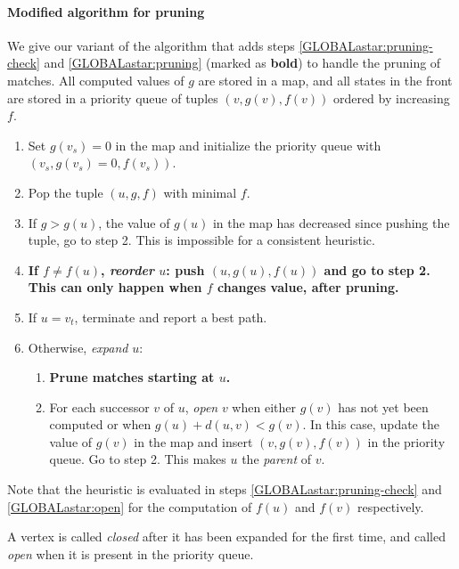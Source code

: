 \paragraph{Modified \A algorithm for pruning} \label{GLOBALsec:astar}


We give our variant of the \A algorithm \citep{hart1968formal} that adds steps
\cref{GLOBALastar:pruning-check} and \cref{GLOBALastar:pruning} (marked as \textbf{bold}) to handle the
pruning of matches. All computed values of $g$ are stored in a map, and all
states in the front are stored in a priority queue of tuples $(v, g(v), f(v))$
ordered by increasing $f$.

\newcommand{\bolditem}{\refstepcounter{enumi}\item[\textbf{\theenumi.}]}
\newcommand{\boldsubitem}{\refstepcounter{enumii}\item[\textbf{\theenumii.}]}
\renewcommand{\algletter}{A}
\begin{enumerate}
  \item Set $g(v_s) = 0$ in the map and initialize the priority queue with
        $(v_s, g(v_s){=}0, f(v_s))$.
  \item Pop the tuple $(u, g, f)$ with minimal $f$.
  \item If $g > g(u)$, \ie the value of $g(u)$ in the map has decreased since pushing the
        tuple, go to step 2. This is impossible for a consistent heuristic.
  \item \label{GLOBALastar:pruning-check} \textbf{If $f \neq f(u)$, \emph{reorder} $u$: push $(u, g(u), f(u))$ and
        go to step 2. This can only happen when $f$ changes value, \ie after
        pruning.}
  \item If $u=v_t$, terminate and report a best path.
  \item Otherwise, \emph{expand} $u$:
  \begin{enumerate}
    \item \label{GLOBALastar:pruning} \textbf{Prune matches starting at $u$.}
    \item \label{GLOBALastar:open}
        For each successor $v$ of $u$, \emph{open} $v$ when either $g(v)$
        has not yet been computed or when $g(u) + d(u,v) < g(v)$.
        In this case, update the value of $g(v)$ in the map and insert $(v, g(v), f(v))$ in
        the priority queue. Go to step 2. This makes $u$ the \emph{parent} of $v$.
  \end{enumerate}
\end{enumerate}

Note that the heuristic is evaluated in steps \cref{GLOBALastar:pruning-check} and
\cref{GLOBALastar:open} for the computation of $f(u)$ and $f(v)$ respectively.

A vertex is called \emph{closed} after it has been expanded for the
first time, and called \emph{open} when it is present in the priority queue.

